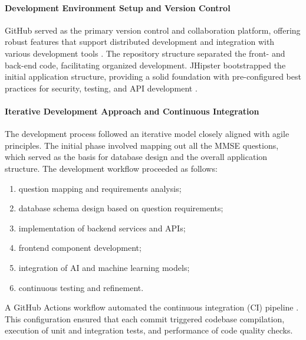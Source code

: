 \paragraph{Development Environment Setup and Version Control}
GitHub served as the primary version control and collaboration platform, offering robust features that support distributed development and integration with various development tools \cite{github}. The repository structure separated the front- and back-end code, facilitating organized development. JHipster bootstrapped the initial application structure, providing a solid foundation with pre-configured best practices for security, testing, and API development \cite{jhipster}.

\paragraph{Iterative Development Approach and Continuous Integration}
The development process followed an iterative model closely aligned with agile principles. The initial phase involved mapping out all the MMSE questions, which served as the basis for database design and the overall application structure. The development workflow proceeded as follows:
\begin{enumerate}
\item question mapping and requirements analysis;
\item database schema design based on question requirements;
\item implementation of backend services and APIs;
\item frontend component development;
\item integration of AI and machine learning models;
\item continuous testing and refinement.
\end{enumerate}

A GitHub Actions workflow automated the continuous integration (CI) pipeline \cite{github_actions}. This configuration ensured that each commit triggered codebase compilation, execution of unit and integration tests, and performance of code quality checks.

